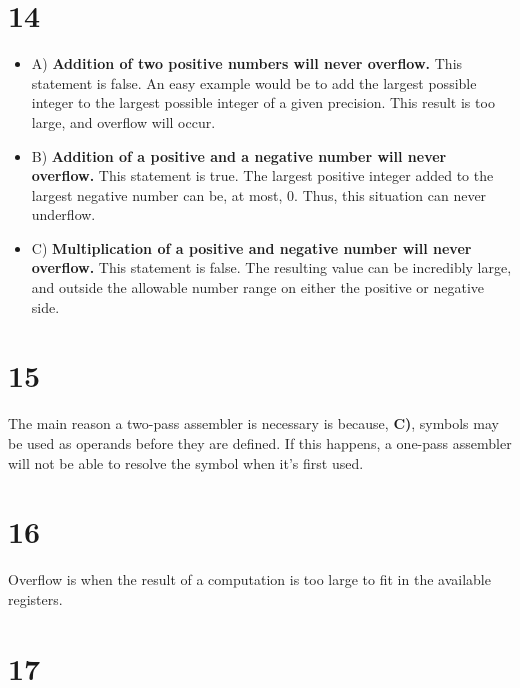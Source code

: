 \documentclass[a4paper,11pt]{article}
\begin{document}

\section*{14}
\begin{itemize}
  \item A) {\bf Addition of two positive numbers will never overflow.}  This statement is false.  An easy example would be to add the largest possible integer to the largest possible integer of a given precision.  This result is too large, and overflow will occur.
  \item B) {\bf Addition of a positive and a negative number will never overflow.}  This statement is true.  The largest positive integer added to the largest negative number can be, at most, 0.  Thus, this situation can never underflow.
  \item C) {\bf Multiplication of a positive and negative number will never overflow.}  This statement is false.  The resulting value can be incredibly large, and outside the allowable number range on either the positive or negative side.
\end{itemize}


\section*{15}
The main reason a two-pass assembler is necessary is because, {\bf C)}, symbols may be used as operands before they are defined.  If this happens, a one-pass assembler will not be able to resolve the symbol when it's first used. 
 

\section*{16}
Overflow is when the result of a computation is too large to fit in the available registers. 


\section*{17}

\end{document}
